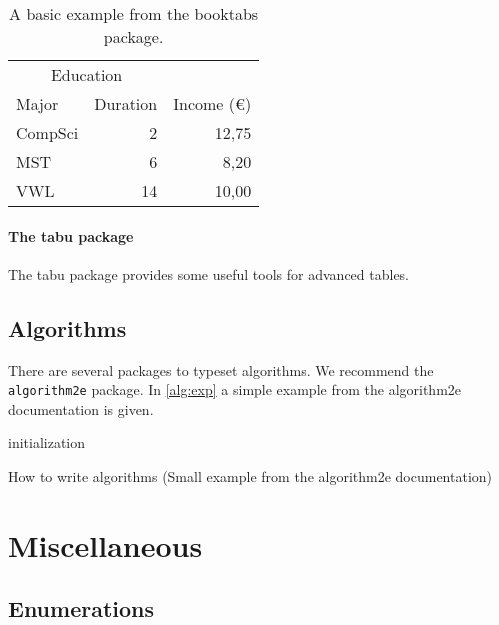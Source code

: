 \documentclass[{{cookiecutter.project_slug}}.tex]{subfiles}
\begin{document}
    \begin{table}
        \centering
        \begin{tabular}{@{}lrr@{}} 
            \toprule
            \multicolumn{2}{c}{Education}\\ \cmidrule{1-2}
            Major & Duration & Income (\euro)\\ 
            \midrule 
            CompSci & 2 & 12,75 \\ \addlinespace
            MST & 6 & 8,20 \\ \addlinespace
            VWL & 14 & 10,00\\ 
            \bottomrule
        \end{tabular}
        \caption[Table Example]{A basic example from the booktabs package.}
        \label{tab::ex}
    \end{table}

    \paragraph{The tabu package}
    The tabu package provides some useful tools for advanced tables.


    \subsection{Algorithms}
    There are several packages to typeset algorithms.
    We recommend the \verb+algorithm2e+ package.
    In \cref{alg:exp} a simple example from the algorithm2e documentation is given.

    \begin{algorithm}[t]
        \SetAlgoLined
        initialization\;
        \caption{How to write algorithms (Small example from the algorithm2e documentation)}
        \label{alg:exp}
    \end{algorithm}

    \section{Miscellaneous}

    \subsection{Enumerations}
\end{document}
